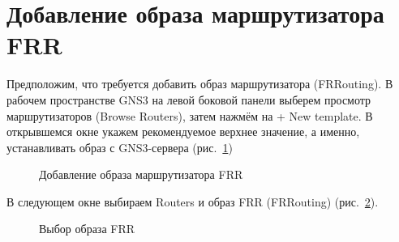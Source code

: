 \documentclass[
  english,
  russian,
  12pt,
  a4paper,
  DIV=11,
  numbers=noendperiod]{scrreprt}
\begin{document}
\section{Добавление образа маршрутизатора
FRR}\label{ux434ux43eux431ux430ux432ux43bux435ux43dux438ux435-ux43eux431ux440ux430ux437ux430-ux43cux430ux440ux448ux440ux443ux442ux438ux437ux430ux442ux43eux440ux430-frr}

Предположим, что требуется добавить образ маршрутизатора (FRRouting). В
рабочем пространстве GNS3 на левой боковой панели выберем просмотр
маршрутизаторов (Browse Routers), затем нажмём на + New template. В
открывшемся окне укажем рекомендуемое верхнее значение, а именно,
устанавливать образ с GNS3-сервера (рис.~\ref{fig-015})

\begin{figure}


\caption{\label{fig-015}Добавление образа маршрутизатора FRR}

\end{figure}%

В следующем окне выбираем Routers и образ FRR (FRRouting)
(рис.~\ref{fig-016}).

\begin{figure}


\caption{\label{fig-016}Выбор образа FRR}

\end{figure}%
\end{document}
